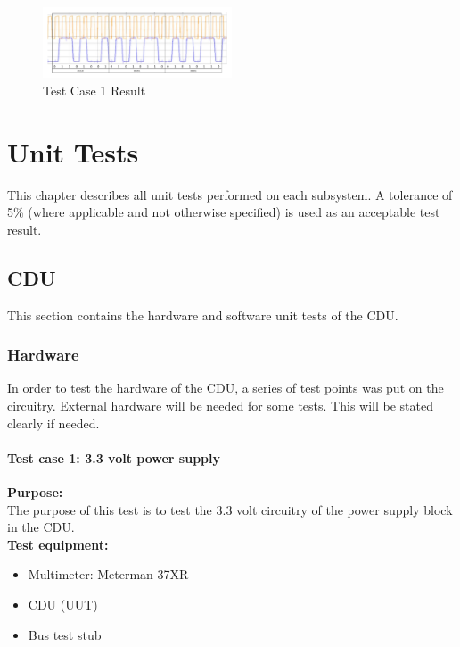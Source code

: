 \begin{figure}[H]
\centering
\includegraphics[width=0.5\textwidth]{billeder/CDUtestcase9}
\caption{Test Case 1 Result}
\label{fig:InteTestCase1}
\end{figure}

\chapter{Unit Tests}
This chapter describes all unit tests performed on each subsystem. A tolerance of 5\% (where applicable and not otherwise specified) is used as an acceptable test result.
\section{CDU}
This section contains the hardware and software unit tests of the CDU.
\subsection{Hardware}
In order to test the hardware of the CDU, a series of test points was put on the circuitry. External hardware will be needed for some tests. This will be stated clearly if needed.
\subsubsection{Test case 1: 3.3 volt power supply}
\textbf{Purpose:}\\
The purpose of this test is to test the 3.3 volt circuitry of the power supply block in the CDU.\\

\textbf{Test equipment:}
\begin{itemize}
\item Multimeter: Meterman 37XR
\item CDU (UUT)
\item Bus test stub
\end{itemize}

